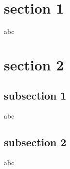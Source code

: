 \documentclass{beamer}
\author[your name]{supervisor \\ your name}
\begin{document}
\begin{frame}
\titlepage
\end{frame} 

\begin{frame}
\tableofcontents
\end{frame}

\section{section 1}
\begin{frame}
    abc
\end{frame} 

\section{section 2}
\subsection{subsection 1}
\begin{frame}
    abc
\end{frame} 

\subsection{subsection 2}
\begin{frame}
    abc
\end{frame} 
\end{document}

